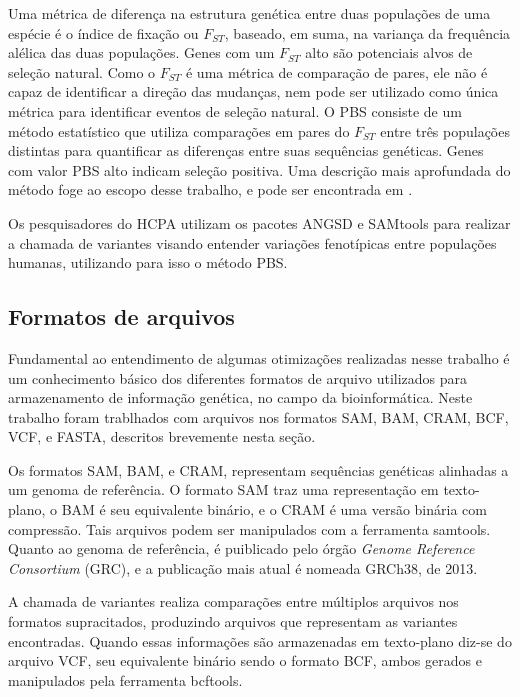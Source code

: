 \documentclass[cic,tc]{iiufrgs}
\begin{document}
Uma métrica de diferença na estrutura genética entre duas populações de uma
espécie é o índice de fixação ou $F_{ST}$, baseado, em suma, na variança da
frequência alélica das duas populações. Genes com um $F_{ST}$ alto são
potenciais alvos de seleção natural.\cite{yi2010sequencing} Como o $F_{ST}$ é
uma métrica de comparação de pares, ele não é capaz de identificar a direção
das mudanças, nem pode ser utilizado como única métrica para identificar
eventos de seleção natural. O PBS consiste de um método estatístico que
utiliza comparações em pares do $F_{ST}$ entre três populações distintas para
quantificar as diferenças entre suas sequências genéticas. Genes com valor
PBS alto indicam seleção positiva.\cite{jiang2019population} Uma descrição
mais aprofundada do método foge ao escopo desse trabalho, e pode ser
encontrada em \cite{yi2010sequencing}.

Os pesquisadores do HCPA utilizam os pacotes ANGSD e SAMtools para realizar
a chamada de variantes visando entender variações fenotípicas entre populações
humanas, utilizando para isso o método PBS.

\subsection{Formatos de arquivos}
\label{sec:formats}

Fundamental ao entendimento de algumas otimizações realizadas nesse trabalho é
um conhecimento básico dos diferentes formatos de arquivo utilizados para
armazenamento de informação genética, no campo da bioinformática. Neste
trabalho foram trablhados com arquivos nos formatos SAM, BAM, CRAM, BCF, VCF, e
FASTA, descritos brevemente nesta seção.

Os formatos SAM, BAM, e CRAM, representam sequências genéticas alinhadas a um
genoma de referência. O formato SAM traz uma representação em texto-plano, o
BAM é seu equivalente binário, e o CRAM é uma versão binária com compressão.
Tais arquivos podem ser manipulados com a ferramenta samtools.\cite{danecek2021twelve}
Quanto ao genoma de referência, é puiblicado pelo órgão \textit{Genome
Reference Consortium} (GRC), e a publicação mais atual é nomeada GRCh38, de
2013.\cite{GUO201783}

A chamada de variantes realiza comparações entre múltiplos arquivos nos
formatos supracitados, produzindo arquivos que representam as variantes
encontradas. Quando essas informações são armazenadas em texto-plano diz-se do
arquivo VCF, seu equivalente binário sendo o formato BCF, ambos gerados e
manipulados pela ferramenta bcftools.\cite{danecek2021twelve}
\end{document}
